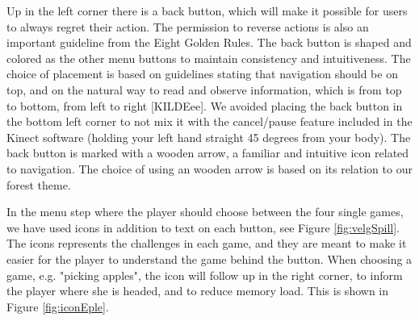 Up in the left corner there is a back button, which will make it possible for users to always regret their action. The permission to reverse actions is also an important guideline from the Eight Golden Rules. The back button is shaped and colored as the other menu buttons to maintain consistency and intuitiveness. The choice of placement is based on guidelines stating that navigation should be on top, and on the natural way to read and observe information, which is from top to bottom, from left to right [KILDEee]. We avoided placing the back button in the bottom left corner to not mix it with the cancel/pause feature included in the Kinect software (holding your left hand straight 45 degrees from your body). The back button is marked with a wooden arrow, a familiar and intuitive icon related to navigation. The choice of using an wooden arrow is based on its relation to our forest theme. 

In the menu step where the player should choose between the four single games, we have used icons in addition to text on each button, see Figure \ref{fig:velgSpill}. The icons represents the challenges in each game, and they are meant to make it easier for the player to understand the game behind the button. When choosing a game, e.g. "picking apples", the icon will follow up in the right corner, to inform the player where she is headed, and to reduce memory load. This is shown in Figure \ref{fig:iconEple}.  

